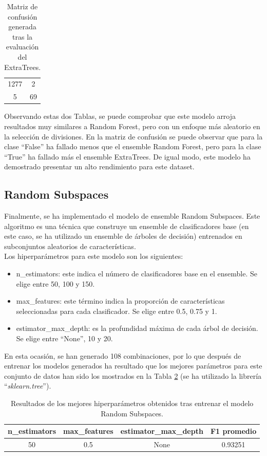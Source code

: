 \documentclass[12pt,letterpaper]{article}
\begin{document}
\begin{table}[H]
    \centering
    \begin{tabular}{|cc|}
    \hline
    1277 & 2 \\
    5 & 69 \\ \hline
    \end{tabular}
    \caption{Matriz de confusión generada tras la evaluación del ExtraTrees.}
    \label{tab:confusion-ET}
\end{table}

Observando estas dos Tablas, se puede comprobar que este modelo arroja resultados muy similares a Random Forest, pero con un enfoque más aleatorio en la selección de divisiones. En la matriz de confusión se puede observar que para la clase ``False'' ha fallado menos que el ensemble Random Forest, pero para la clase ``True'' ha fallado más el ensemble ExtraTrees. De igual modo, este modelo ha demostrado presentar un alto rendimiento para este dataset.

\subsection{Random Subspaces}
Finalmente, se ha implementado el modelo de ensemble Random Subspaces. Este algoritmo es una técnica que construye un ensemble de clasificadores base (en este caso, se ha utilizado un ensemble de árboles de decisión) entrenados en subconjuntos aleatorios de características.\\
Los hiperparámetros para este modelo son los siguientes:
\begin{itemize}
    \item n\_estimators: este indica el número de clasificadores base en el ensemble. Se elige entre 50, 100 y 150.
    \item max\_features: este término indica la proporción de características seleccionadas para cada clasificador. Se elige entre 0.5, 0.75 y 1.
    \item estimator\_max\_depth: es la profundidad máxima de cada árbol de decisión. Se elige entre ``None'', 10 y 20.
\end{itemize}

En esta ocasión, se han generado 108 combinaciones, por lo que después de entrenar los modelos generados ha resultado que los mejores parámetros para este conjunto de datos han sido los mostrados en la Tabla \ref{tab:hiper-RS} (se ha utilizado la librería ``\textit{sklearn.tree}'').
\begin{table}[H]
    \centering
    \begin{tabular}{ccc|c}
    \hline
    \textbf{n\_estimators} &  \textbf{max\_features} & \textbf{estimator\_max\_depth } & \textbf{F1 promedio} \\ \hline
    50 & 0.5 & None & 0.93251 \\ \hline
    \end{tabular}
    \caption{Resultados de los mejores hiperparámetros obtenidos tras entrenar el modelo Random Subspaces.}
    \label{tab:hiper-RS}
\end{table}
\end{document}
